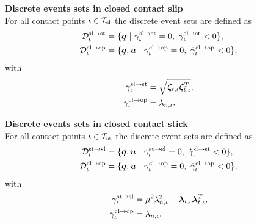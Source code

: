 \documentclass[../DC2017114Bouma.tex]{subfiles}
\begin{document}
\textbf{Discrete events sets in closed contact slip}\\
For all contact points $\iota\in\mathcal{I}_{\text{sl}}$ the discrete event sets are defined as
\begin{align}
\mathcal{D}^{\text{sl}\rightarrow\text{st}}_{\iota} &= \{ \qb\ |\ \gamma^{\text{sl}\rightarrow\text{st}}_{\iota} = 0,\ \dot{\gamma}^{\text{sl}\rightarrow\text{st}}_{\iota} < 0\},\label{eq:2Dslst}\\
\mathcal{D}^{\text{cl}\rightarrow\text{op}}_{\iota} &= \{ \qb,\ub\ |\ \gamma^{\text{cl}\rightarrow\text{op}}_{\iota} = 0,\ \dot{\gamma}^{\text{cl}\rightarrow\text{op}}_{\iota} < 0\},\label{eq:2Dslop}
\end{align}
with 
\begin{align}
\gamma^{\text{sl}\rightarrow\text{st}}_{\iota} &= \sqrt{\boldsymbol{\zeta}_{t,\iota}\boldsymbol{\zeta}_{t,\iota}^T},\\
\gamma^{\text{cl}\rightarrow\text{op}}_{\iota} &= \lambda_{n,\iota}.
\end{align}

\textbf{Discrete events sets in closed contact stick}\\
For all contact points $\iota\in\mathcal{I}_{\text{st}}$ the discrete event sets are defined as
\begin{align}
\mathcal{D}^{\text{st}\rightarrow\text{sl}}_{\iota} &= \{ \qb,\ub\ |\ \gamma^{\text{st}\rightarrow\text{sl}}_{\iota} = 0,\ \dot{\gamma}^{\text{sl}\rightarrow\text{st}}_{\iota} < 0\},\label{eq:2Dstsl}\\
\mathcal{D}^{\text{cl}\rightarrow\text{op}}_{\iota} &= \{ \qb,\ub\ |\ \gamma^{\text{cl}\rightarrow\text{op}}_{\iota} = 0,\ \dot{\gamma}^{\text{cl}\rightarrow\text{op}}_{\iota} < 0\},\label{eq:2Dstop}
\end{align}
with 
\begin{align}
\gamma^{\text{st}\rightarrow\text{sl}}_{\iota} &= \mu^2\lambda_{n,\iota}^2-\boldsymbol{\lambda}_{t,\iota}\boldsymbol{\lambda}_{t,\iota}^T,\\
\gamma^{\text{cl}\rightarrow\text{op}}_{\iota} &= \lambda_{n,\iota}.
\end{align}
\end{document}
